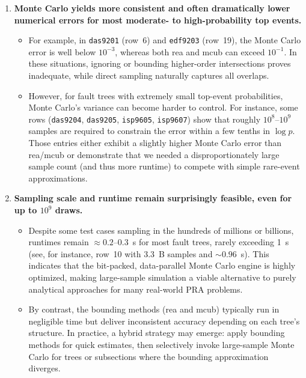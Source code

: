 \begin{enumerate}
    \item \textbf{Monte Carlo yields more consistent and often dramatically lower numerical errors for most moderate- to high-probability top events.}
    \begin{itemize}
        \item For example, in \texttt{das9201} (row~6) and \texttt{edf9203} (row~19), the Monte Carlo error is well below \(10^{-3}\), whereas both \acrshort{rea} and \acrshort{mcub} can exceed \(10^{-1}\). In these situations, ignoring or bounding higher-order intersections proves inadequate, while direct sampling naturally captures all overlaps.
        \item However, for fault trees with extremely small top-event probabilities, Monte Carlo's variance can become harder to control. For instance, some rows (\texttt{das9204}, \texttt{das9205}, \texttt{isp9605}, \texttt{isp9607}) show that roughly \(10^{8}\)--\(10^{9}\) samples are required to constrain the error within a few tenths in \(\log p\). Those entries either exhibit a slightly higher Monte Carlo error than \acrshort{rea}/\acrshort{mcub} or demonstrate that we needed a disproportionately large sample count (and thus more runtime) to compete with simple rare-event approximations.
    \end{itemize}

    \item \textbf{Sampling scale and runtime remain surprisingly feasible, even for up to \(10^{9}\) draws.}
    \begin{itemize}
        \item Despite some test cases sampling in the hundreds of millions or billions, runtimes remain \(\approx 0.2\)--\(0.3\)~s for most fault trees, rarely exceeding 1~s (see, for instance, row~10 with 3.3~B samples and \(\sim 0.96\)~s). This indicates that the bit-packed, data-parallel Monte Carlo engine is highly optimized, making large-sample simulation a viable alternative to purely analytical approaches for many real-world PRA problems.
        \item By contrast, the bounding methods (\acrshort{rea} and \acrshort{mcub}) typically run in negligible time but deliver inconsistent accuracy depending on each tree's structure. In practice, a hybrid strategy may emerge: apply bounding methods for quick estimates, then selectively invoke large-sample Monte Carlo for trees or subsections where the bounding approximation diverges.
    \end{itemize}


\end{enumerate}
